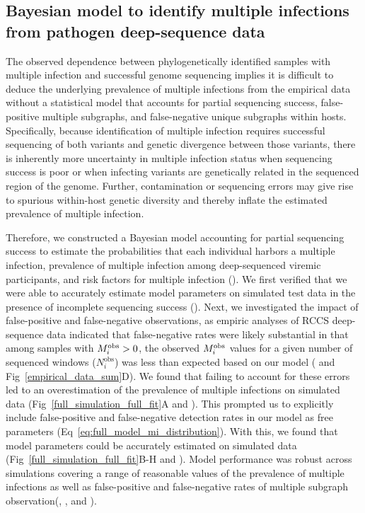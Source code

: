 \documentclass[10pt,letterpaper]{article}
\newcommand{\MI}{M^{\text{\text{obs}}}}
\begin{document}
\subsection{Bayesian model to identify multiple infections from pathogen deep-sequence data}
The observed dependence between phylogenetically identified samples with multiple infection and successful genome sequencing implies it is difficult to deduce the underlying prevalence of multiple infections from the empirical data without a statistical model that accounts for partial sequencing success, false-positive multiple subgraphs, and false-negative unique subgraphs within hosts. Specifically, because identification of multiple infection requires successful sequencing of both variants and genetic divergence between those variants, there is inherently more uncertainty in multiple infection status when sequencing success is poor or when infecting variants are genetically related in the sequenced region of the genome. Further, contamination or sequencing errors may give rise to spurious within-host genetic diversity and thereby inflate the estimated prevalence of multiple infection. \par

Therefore, we constructed a Bayesian model accounting for partial sequencing success to estimate the probabilities that each individual harbors a multiple infection, prevalence of multiple infection among deep-sequenced viremic participants, and  risk factors for multiple infection (). We first verified that we were able to accurately estimate model parameters on simulated test data  in the presence of incomplete sequencing success (). Next, we investigated the impact of false-positive and false-negative observations, as empiric analyses of RCCS deep-sequence data indicated that false-negative rates were likely substantial in that among samples with $\MI_i > 0$, the observed $\MI_i$ values for a given number of sequenced windows ($N^{\text{obs}}_i$) was less than expected based on our model ( and  Fig~\ref{empirical_data_sum}D). We found that failing to account for these errors led to an overestimation of the prevalence of multiple infections on simulated data (Fig~\ref{full_simulation_full_fit}A and ). This prompted us to explicitly include false-positive and false-negative detection rates in our model as free parameters (Eq~\ref{eq:full_model_mi_distribution}). With this, we found that model parameters could be accurately estimated on simulated data (Fig~\ref{full_simulation_full_fit}B-H and ). Model performance was robust across simulations covering a range of reasonable values of the prevalence of multiple infections as well as false-positive and false-negative rates of multiple subgraph observation(, , and ). \par 
\end{document}
